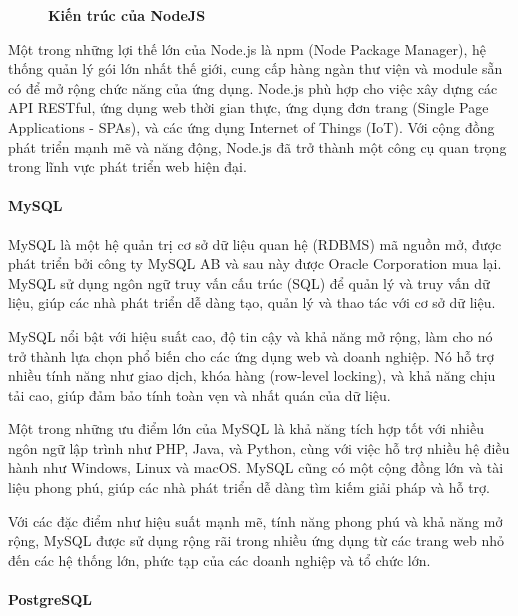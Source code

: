 \begin{figure}[H]
  \centering
  \caption[Kiến trúc của NodeJS]{\bfseries \fontsize{12pt}{0pt}
  \selectfont Kiến trúc của NodeJS}
  \label{ble_services} %
\end{figure}
Một trong những lợi thế lớn của Node.js là npm (Node Package Manager), hệ thống quản lý gói lớn nhất thế giới, cung cấp hàng ngàn thư viện và module sẵn có để mở rộng chức năng của ứng dụng. Node.js phù hợp cho việc xây dựng các API RESTful, ứng dụng web thời gian thực, ứng dụng đơn trang (Single Page Applications - SPAs), và các ứng dụng Internet of Things (IoT). Với cộng đồng phát triển mạnh mẽ và năng động, Node.js đã trở thành một công cụ quan trọng trong lĩnh vực phát triển web hiện đại.

\paragraph{MySQL}
\mbox{}

MySQL là một hệ quản trị cơ sở dữ liệu quan hệ (RDBMS) mã nguồn mở, được phát triển bởi công ty MySQL AB và sau này được Oracle Corporation mua lại. MySQL sử dụng ngôn ngữ truy vấn cấu trúc (SQL) để quản lý và truy vấn dữ liệu, giúp các nhà phát triển dễ dàng tạo, quản lý và thao tác với cơ sở dữ liệu.\cite{mysql_1}

MySQL nổi bật với hiệu suất cao, độ tin cậy và khả năng mở rộng, làm cho nó trở thành lựa chọn phổ biến cho các ứng dụng web và doanh nghiệp. Nó hỗ trợ nhiều tính năng như giao dịch, khóa hàng (row-level locking), và khả năng chịu tải cao, giúp đảm bảo tính toàn vẹn và nhất quán của dữ liệu.

Một trong những ưu điểm lớn của MySQL là khả năng tích hợp tốt với nhiều ngôn ngữ lập trình như PHP, Java, và Python, cùng với việc hỗ trợ nhiều hệ điều hành như Windows, Linux và macOS. MySQL cũng có một cộng đồng lớn và tài liệu phong phú, giúp các nhà phát triển dễ dàng tìm kiếm giải pháp và hỗ trợ.

Với các đặc điểm như hiệu suất mạnh mẽ, tính năng phong phú và khả năng mở rộng, MySQL được sử dụng rộng rãi trong nhiều ứng dụng từ các trang web nhỏ đến các hệ thống lớn, phức tạp của các doanh nghiệp và tổ chức lớn.
\paragraph{PostgreSQL}
\mbox{}

